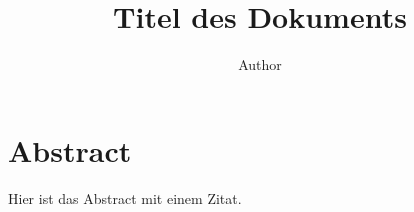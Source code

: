 \documentclass[a4paper]{article}
\title{Titel des Dokuments}
\author{Author}
\begin{document}
\maketitle
\pagebreak
\tableofcontents
\pagebreak

\section{Abstract}
Hier ist das Abstract mit einem Zitat\cite[p.~150]{quellenName}.

\pagebreak


    
\end{document}
